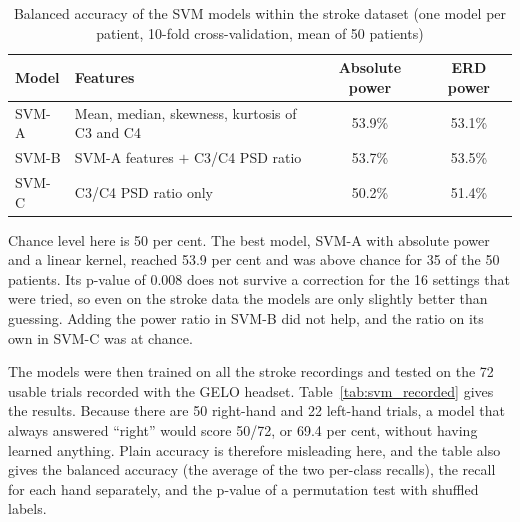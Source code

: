 \begin{table}[!ht]
\centering
\caption{Balanced accuracy of the SVM models within the stroke dataset (one model per patient, 10-fold cross-validation, mean of 50 patients)}
\label{tab:svm_accuracy}
\begin{tabular}{|l|p{5.6cm}|c|c|}
\hline
\textbf{Model} & \textbf{Features} & \textbf{Absolute power} & \textbf{ERD power} \\
\hline
SVM-A & Mean, median, skewness, kurtosis of C3 and C4 & 53.9\% & 53.1\% \\
\hline
SVM-B & SVM-A features $+$ C3/C4 PSD ratio & 53.7\% & 53.5\% \\
\hline
SVM-C & C3/C4 PSD ratio only & 50.2\% & 51.4\% \\
\hline
\end{tabular}
\end{table}

Chance level here is 50 per cent. The best model, SVM-A with absolute power and a linear
kernel, reached 53.9 per cent and was above chance for 35 of the 50 patients. Its
p-value of 0.008 does not survive a correction for the 16 settings that were tried, so even
on the stroke data the models are only slightly better than guessing. Adding the power
ratio in SVM-B did not help, and the ratio on its own in SVM-C was at chance.

The models were then trained on all the stroke recordings and tested on the 72 usable
trials recorded with the GELO headset. Table~\ref{tab:svm_recorded} gives the results.
Because there are 50 right-hand and 22 left-hand trials, a model that always answered
``right'' would score 50/72, or 69.4 per cent, without having learned anything. Plain
accuracy is therefore misleading here, and the table also gives the balanced accuracy (the
average of the two per-class recalls), the recall for each hand separately, and the
p-value of a permutation test with shuffled labels.

